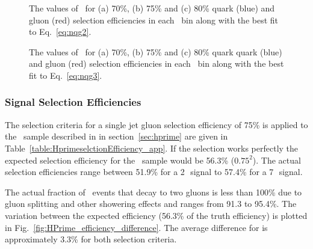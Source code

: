 \begin{figure}[p]
 \centering

\caption{ The values of \ntrk\ for (a) 70\%,  (b) 75\%  and (c) 80\% quark (blue) and gluon (red) 
selection efficiencies in each \pT\ bin along with the best fit to Eq.~\ref{eq:nqg2}.
 \label{fig:qg_selection_curves_app}}
\end{figure}

\begin{figure}[p]
 \centering

\caption{ The values of \ntrk\ for  (a) 70\%,  (b) 75\%  and (c) 80\% quark  quark (blue) and gluon (red) 
selection efficiencies in each \pT\ bin along with the best fit to Eq.~\ref{eq:nqg3}.
 \label{fig:qg_selection_curves2}}
\end{figure}


\subsubsection{Signal Selection Efficiencies}


The selection criteria for a single jet gluon selection efficiency of 75\% is applied to the \Hprime\ 
sample described in in section~\ref{sec:hprime} are given in Table~\ref{table:HprimeselctionEfficiency_app}. 
If the selection works perfectly the expected selection efficiency for the \Hprime\ sample would be 56.3\% ($0.75^2$). 
The actual selection efficiencies range between 51.9\% for a 2\,\TeV\ signal to 57.4\% for a 7\,\TeV\ signal. 

The actual fraction of \Hprime\ events that decay to two gluons is less than 100\% due to gluon splitting and other showering 
effects and ranges from 91.3 to 95.4\%. The variation between the expected efficiency (56.3\% of the truth efficiency) 
is plotted in Fig.~\ref{fig:HPrime_efficiency_difference}. The average difference for is approximately 3.3\% for both selection criteria.

